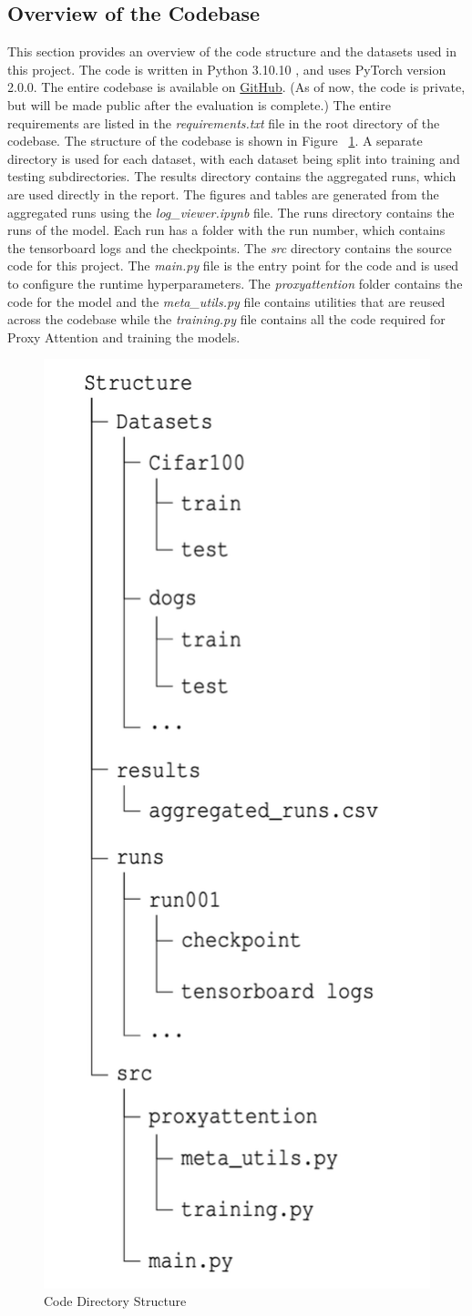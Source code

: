 \subsection{Overview of the Codebase}
This section provides an overview of the code structure and the datasets used in this project. The code is written in Python 3.10.10 , and uses PyTorch version 2.0.0. The entire codebase is available on \href{https://github.com/SubhadityaMukherjee/proxy_attention}{GitHub}. (As of now, the code is private, but will be made public after the evaluation is complete.) The entire requirements are listed in the \textit{requirements.txt} file in the root directory of the codebase. The structure of the codebase is shown in Figure ~\ref{fig:overview_code}.
A separate directory is used for each dataset, with each dataset being split into training and testing subdirectories. The results directory contains the aggregated runs, which are used directly in the report. The figures and tables are generated from the aggregated runs using the \textit{log\_viewer.ipynb} file. The runs directory contains the runs of the model. Each run has a folder with the run number, which contains the tensorboard logs and the checkpoints. 
The \textit{src} directory contains the source code for this project. The \textit{main.py} file is the entry point for the code and is used to configure the runtime hyperparameters. The \textit{proxyattention} folder contains the code for the model and the \textit{meta\_utils.py} file contains utilities that are reused across the codebase while the \textit{training.py} file contains all the code required for Proxy Attention and training the models.

\begin{figure}[!htb]
    \centering
    \includegraphics[width=.3\linewidth]{images/dirstruct.png}
    \caption{Code Directory Structure}
    \label{fig:overview_code}
\end{figure}


